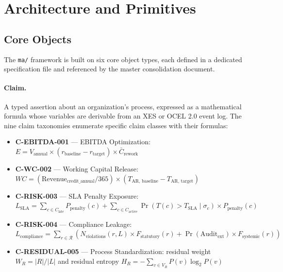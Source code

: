 
\section{Architecture and Primitives}
\label{sec:ma-architecture}

\subsection{Core Objects}
\label{sec:ma-arch-objects}

The \texttt{ma/} framework is built on six core object types, each defined in a dedicated
specification file and referenced by the master consolidation document.

\paragraph{Claim.} A typed assertion about an organization's process, expressed as a
mathematical formula whose variables are derivable from an XES or OCEL 2.0 event log. The
nine claim taxonomies enumerate specific claim classes with their formulas:

\begin{itemize}
  \item \textbf{C-EBITDA-001} --- EBITDA Optimization:
    $E = V_{\text{annual}} \times (r_{\text{baseline}} - r_{\text{target}}) \times
    \bar{C}_{\text{rework}}$
  \item \textbf{C-WC-002} --- Working Capital Release:
    $WC = (\text{Revenue}_{\text{credit\_annual}} / 365) \times (T_{\text{AR, baseline}} -
    T_{\text{AR, target}})$
  \item \textbf{C-RISK-003} --- SLA Penalty Exposure:
    $L_{\text{SLA}} = \sum_{c \in C_{\text{late}}} P_{\text{penalty}}(c) +
    \sum_{c \in C_{\text{active}}} \Pr(T(c) > T_{\text{SLA}} \mid \sigma_c) \times
    P_{\text{penalty}}(c)$
  \item \textbf{C-RISK-004} --- Compliance Leakage:
    $L_{\text{compliance}} = \sum_{r \in \mathcal{R}} (N_{\text{violations}}(r, L) \times
    F_{\text{statutory}}(r) + \Pr(\text{Audit}_{\text{ext}}) \times F_{\text{systemic}}(r))$
  \item \textbf{C-RESIDUAL-005} --- Process Standardization: residual weight
    $W_R = |R| / |L|$ and residual entropy $H_R = -\sum_{v \in V_R} P(v) \log_2 P(v)$
\end{itemize}

